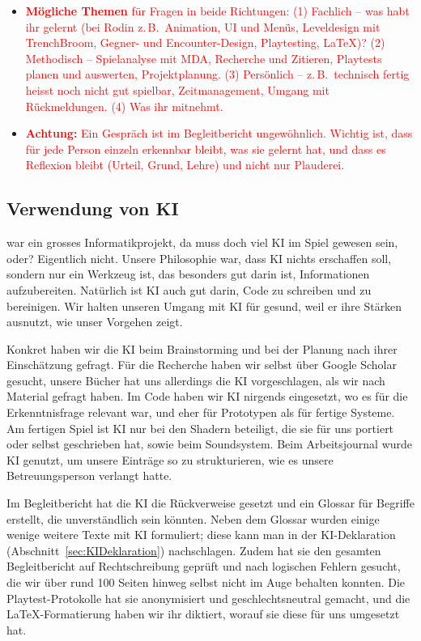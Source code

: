 \documentclass[../Main.tex]{subfiles}
\begin{document}
\begin{itemize}[leftmargin=1.5cm]
    \item \textcolor{red}{\textbf{Mögliche Themen} für Fragen in beide Richtungen: (1) Fachlich -- was habt ihr gelernt (bei Rodin z.\,B.\ Animation, UI und Menüs, Leveldesign mit TrenchBroom, Gegner- und Encounter-Design, Playtesting, \LaTeX)? (2) Methodisch -- Spielanalyse mit MDA, Recherche und Zitieren, Playtests planen und auswerten, Projektplanung. (3) Persönlich -- z.\,B.\ technisch fertig heisst noch nicht gut spielbar, Zeitmanagement, Umgang mit Rückmeldungen. (4) Was ihr mitnehmt.}
    \item \textcolor{red}{\textbf{Achtung:} Ein Gespräch ist im Begleitbericht ungewöhnlich. Wichtig ist, dass für jede Person einzeln erkennbar bleibt, was sie gelernt hat, und dass es Reflexion bleibt (Urteil, Grund, Lehre) und nicht nur Plauderei.}
\end{itemize}

\subsection{Verwendung von KI} \label{sec:ReflexionKI}

 war ein grosses Informatikprojekt, da muss doch viel KI im Spiel gewesen sein, oder? Eigentlich nicht. Unsere Philosophie war, dass KI nichts erschaffen soll, sondern nur ein Werkzeug ist, das besonders gut darin ist, Informationen aufzubereiten. Natürlich ist KI auch gut darin, Code zu schreiben und zu bereinigen. Wir halten unseren Umgang mit KI für gesund, weil er ihre Stärken ausnutzt, wie unser Vorgehen zeigt.

Konkret haben wir die KI beim Brainstorming und bei der Planung nach ihrer Einschätzung gefragt. Für die Recherche haben wir selbst über Google Scholar gesucht, unsere Bücher hat uns allerdings die KI vorgeschlagen, als wir nach Material gefragt haben. Im Code haben wir KI nirgends eingesetzt, wo es für die Erkenntnisfrage relevant war, und eher für Prototypen als für fertige Systeme. Am fertigen Spiel ist KI nur bei den Shadern beteiligt, die sie für uns portiert oder selbst geschrieben hat, sowie beim Soundsystem. Beim Arbeitsjournal wurde KI genutzt, um unsere Einträge so zu strukturieren, wie es unsere Betreuungsperson verlangt hatte.

Im Begleitbericht hat die KI die Rückverweise gesetzt und ein Glossar für Begriffe erstellt, die unverständlich sein könnten. Neben dem Glossar wurden einige wenige weitere Texte mit KI formuliert; diese kann man in der KI-Deklaration (Abschnitt~\ref{sec:KIDeklaration}) nachschlagen. Zudem hat sie den gesamten Begleitbericht auf Rechtschreibung geprüft und nach logischen Fehlern gesucht, die wir über rund 100 Seiten hinweg selbst nicht im Auge behalten konnten. Die Playtest-Protokolle hat sie anonymisiert und geschlechtsneutral gemacht, und die \LaTeX-Formatierung haben wir ihr diktiert, worauf sie diese für uns umgesetzt hat.
\end{document}
